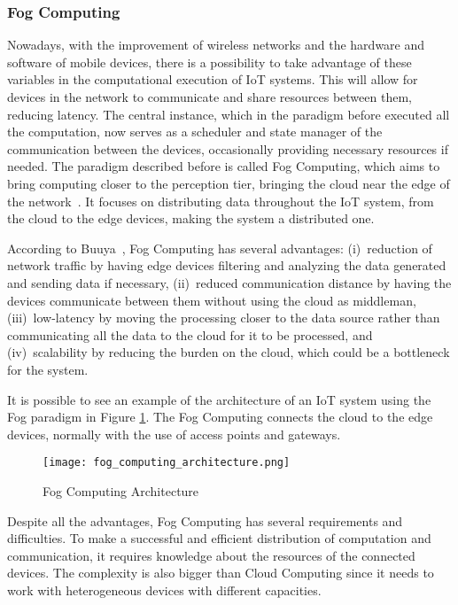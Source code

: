 \subsubsection{Fog Computing}\label{sec:fog_computing}

Nowadays, with the improvement of wireless networks and the hardware and software of mobile devices, there is a possibility to take advantage of these variables in the computational execution of IoT systems. This will allow for devices in the network to communicate and share resources between them, reducing latency. The central instance, which in the paradigm before executed all the computation, now serves as a scheduler and state manager of the communication between the devices, occasionally providing necessary resources if needed. The paradigm described before is called Fog Computing, which aims to bring computing closer to the perception tier, bringing the cloud near the edge of the network~\cite{mobile_cloud}. It focuses on distributing data throughout the IoT system, from the cloud to the edge devices, making the system a distributed one.

According to Buuya~\cite{IoT_principles_and_paradigms}, Fog Computing has several advantages: (i)~reduction of network traffic by having edge devices filtering and analyzing the data generated and sending data if necessary, (ii)~reduced communication distance by having the devices communicate between them without using the cloud as middleman, (iii)~low-latency by moving the processing closer to the data source rather than communicating all the data to the cloud for it to be processed, and (iv)~scalability by reducing the burden on the cloud, which could be a bottleneck for the system.

It is possible to see an example of the architecture of an IoT system using the Fog paradigm in Figure \ref{fig:fog_architecture}. The Fog Computing connects the cloud to the edge devices, normally with the use of access points and gateways. 

\begin{figure}[h]
\centering
\texttt{[image: fog\_computing\_architecture.png]}
\caption[Fog Computing Architecture]{Fog Computing Architecture~\cite{IoT_principles_and_paradigms}}
\label{fig:fog_architecture}
\end{figure}

Despite all the advantages, Fog Computing has several requirements and difficulties. To make a successful and efficient distribution of computation and communication, it requires knowledge about the resources of the connected devices. The complexity is also bigger than Cloud Computing since it needs to work with heterogeneous devices with different capacities. 
       
